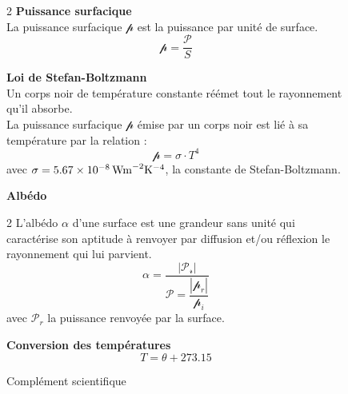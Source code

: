 \documentclass[a4paper,11pt,fleqn]{article}%
\begin{document}
\begin{figure}[h!]
\caption{Complément scientifique}
\begin{multicols}{2}
\textbf{Puissance surfacique}\\
La puissance surfacique $\mathcal{p}$ est la puissance par unité de surface.
$$\mathcal{p} = \dfrac{\mathcal{P}}{S}$$

\textbf{Loi de Stefan-Boltzmann}\\
Un corps noir de température constante réémet tout le rayonnement qu'il absorbe.\\
La puissance surfacique $\mathcal{p}$ émise par un corps noir est lié à sa température par la relation :
$$\mathcal{p} = \sigma \cdot T^4$$
avec $\sigma = \SI{5,67E-8}{W m^{-2} K^{-4}}$, la constante de Stefan-Boltzmann.

\columnbreak
\textbf{Albédo}
\begin{multicols}{2}
L'albédo $\alpha$  d'une surface est une grandeur sans unité qui caractérise son aptitude à renvoyer par diffusion et/ou réflexion le rayonnement qui lui parvient.
$$ \alpha = \dfrac{|\mathcal{P_r}|}{\mathcal{P} = \dfrac{|\mathcal{p}_r|}{\mathcal{p}_i}}$$
avec $\mathcal{P}_r$ la puissance renvoyée par la surface.

\end{multicols}

\textbf{Conversion des températures}
$$T=\theta + \num{273,15}$$
\end{multicols}
\end{figure}
\end{document}
